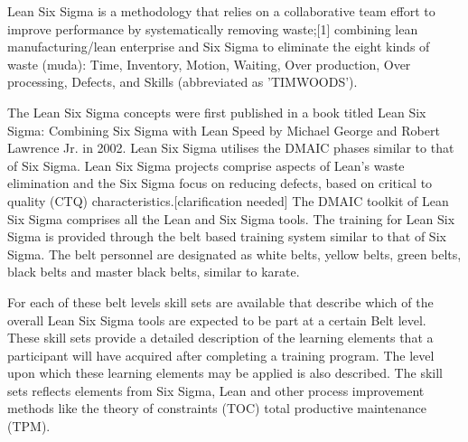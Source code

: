 Lean Six Sigma is a methodology that relies on a collaborative team effort to improve performance by systematically removing waste;[1] combining lean manufacturing/lean enterprise and Six Sigma to eliminate the eight kinds of waste (muda): Time, Inventory, Motion, Waiting, Over production, Over processing, Defects, and Skills (abbreviated as 'TIMWOODS').

The Lean Six Sigma concepts were first published in a book titled Lean Six Sigma: Combining Six Sigma with Lean Speed by Michael George and Robert Lawrence Jr. in 2002. Lean Six Sigma utilises the DMAIC phases similar to that of Six Sigma. Lean Six Sigma projects comprise aspects of Lean's waste elimination and the Six Sigma focus on reducing defects, based on critical to quality (CTQ) characteristics.[clarification needed] The DMAIC toolkit of Lean Six Sigma comprises all the Lean and Six Sigma tools. The training for Lean Six Sigma is provided through the belt based training system similar to that of Six Sigma. The belt personnel are designated as white belts, yellow belts, green belts, black belts and master black belts, similar to karate.

For each of these belt levels skill sets are available that describe which of the overall Lean Six Sigma tools are expected to be part at a certain Belt level. These skill sets provide a detailed description of the learning elements that a participant will have acquired after completing a training program. The level upon which these learning elements may be applied is also described. The skill sets reflects elements from Six Sigma, Lean and other process improvement methods like the theory of constraints (TOC) total productive maintenance (TPM).
